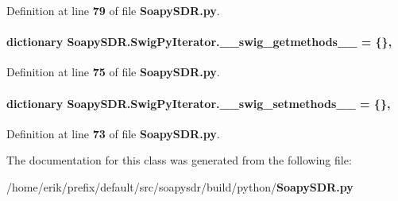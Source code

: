 Definition at line {\bf 79} of file {\bf Soapy\+S\+D\+R.\+py}.

\paragraph[{\+\_\+\+\_\+swig\+\_\+getmethods\+\_\+\+\_\+}]{\setlength{\rightskip}{0pt plus 5cm}dictionary Soapy\+S\+D\+R.\+Swig\+Py\+Iterator.\+\_\+\+\_\+swig\+\_\+getmethods\+\_\+\+\_\+ = \{\}\hspace{0.3cm}{\ttfamily [static]}, {\ttfamily [private]}}\label{classSoapySDR_1_1SwigPyIterator_a1bd7a602b1ddc6f556cc8f86957b128f}


Definition at line {\bf 75} of file {\bf Soapy\+S\+D\+R.\+py}.

\paragraph[{\+\_\+\+\_\+swig\+\_\+setmethods\+\_\+\+\_\+}]{\setlength{\rightskip}{0pt plus 5cm}dictionary Soapy\+S\+D\+R.\+Swig\+Py\+Iterator.\+\_\+\+\_\+swig\+\_\+setmethods\+\_\+\+\_\+ = \{\}\hspace{0.3cm}{\ttfamily [static]}, {\ttfamily [private]}}\label{classSoapySDR_1_1SwigPyIterator_adfe2b9bd3f9d671cd2eea1001fa6866a}


Definition at line {\bf 73} of file {\bf Soapy\+S\+D\+R.\+py}.



The documentation for this class was generated from the following file\+:\begin{DoxyCompactItemize}
\item 
/home/erik/prefix/default/src/soapysdr/build/python/{\bf Soapy\+S\+D\+R.\+py}\end{DoxyCompactItemize}
